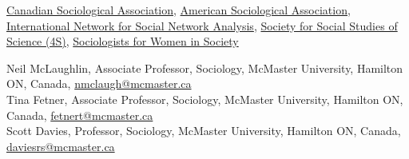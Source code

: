 \documentclass[11pt,usenames,dvipsnames]{article}
\begin{document}


\noindent \href{http://www.csa-scs.ca}{Canadian Sociological Association}, \href{http://www.asanet.org}{American Sociological Association}, \href{http://www.insna.org}{International Network for Social Network Analysis}, \href{http://4sonline.org}{Society for Social Studies of Science (4S)}, \href{http://www.socwomen.org}{Sociologists for Women in Society} \\


\noindent Neil McLaughlin, Associate Professor, Sociology, McMaster University, Hamilton ON, Canada, \href{mailto:nmclaugh@mcmaster.ca}{nmclaugh@mcmaster.ca}\\

\noindent Tina Fetner, Associate Professor, Sociology, McMaster University, Hamilton ON, Canada, \href{mailto:fetnert@mcmaster.ca}{fetnert@mcmaster.ca}\\

\noindent Scott Davies, Professor, Sociology, McMaster University, Hamilton ON, Canada, \href{mailto:daviesrs@mcmaster.ca}{daviesrs@mcmaster.ca}
\end{document}
